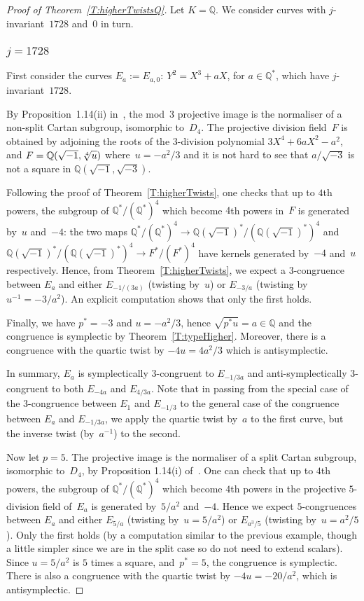 \documentclass[twoside,leqno,symbols-for-thanks, draft]{rmi}
\numberwithin{equation}{section}
\newcommand{\Q}{\mathbb{Q}}
\theoremstyle{remark}
\begin{document}
\begin{proof}[Proof of Theorem~\ref{T:higherTwistsQ}] Let $K=\Q$.  We
  consider curves with $j$-invariant~$1728$ and~$0$ in turn.

\subsubsection*{$j=1728$}
  First consider the curves $E_a := E_{a,0}:\ Y^2=X^3+aX$, for $a \in
  \Q^*$, which have $j$-invariant~$1728$.

  By Proposition~1.14(ii)
  in~\cite{Zywina}, the mod~$3$ projective image is the normaliser of
  a non-split Cartan subgroup, isomorphic to~$D_4$.  The projective
  division field~$F$ is obtained by adjoining the roots of the
  $3$-division polynomial $3X^4+6aX^2-a^2$, and
  $F=\Q(\sqrt{-1},\root4\of u)$ where~$u=-a^2/3$ and it is not hard to
  see that $a/\sqrt{-3}$ is not a square in $\Q(\sqrt{-1},\sqrt{-3})$.

Following the proof of Theorem~\ref{T:higherTwists}, one checks
that up to $4$th powers, the subgroup of $\Q^*/(\Q^*)^4$ which become
$4$th powers in~$F$ is generated by~$u$ and~$-4$: the two maps
$\Q^*/(\Q^*)^4 \to \Q(\sqrt{-1})^*/(\Q(\sqrt{-1})^*)^4$ and
$\Q(\sqrt{-1})^*/(\Q(\sqrt{-1})^*)^4 \to F^*/(F^*)^4$ have kernels
generated by~$-4$ and~$u$ respectively.  Hence, from
Theorem~\ref{T:higherTwists}, we expect a $3$-congruence between
$E_a$ and either $E_{-1/(3a)}$ (twisting by~$u$) or $E_{-3/a}$
(twisting by~$u^{-1}=-3/a^2$).  An explicit computation shows that
only the first holds.

Finally, we have $p^* = -3$ and $u=-a^2/3$, hence $\sqrt{p^*u} = a \in
\Q$ and the congruence is symplectic by Theorem~\ref{T:typeHigher}.
Moreover, there is a congruence with the quartic twist by $-4u=4a^2/3$
which is antisymplectic.

In summary, $E_a$ is symplectically $3$-congruent to $E_{-1/3a}$ and
anti-symplectically $3$-congruent to both $E_{-4a}$ and $E_{4/3a}$.
Note that in passing from the special case of the $3$-congruence
between $E_1$ and $E_{-1/3}$ to the general case of the congruence
between $E_{a}$ and $E_{-1/3a}$, we apply the quartic twist by~$a$ to
the first curve, but the inverse twist (by~$a^{-1}$) to the second.

Now let $p=5$.  The projective image is the normaliser of a split
Cartan subgroup, isomorphic to~$D_4$, by Proposition 1.14(i)
of~\cite{Zywina}.  One can check that up to $4$th powers, the subgroup
of $\Q^*/(\Q^*)^4$ which become $4$th powers in the projective
$5$-division field of~$E_a$ is generated by~$5/a^2$ and~$-4$.  Hence
we expect $5$-congruences between $E_a$ and either $E_{5/a}$ (twisting
by~$u=5/a^2$) or $E_{a^3/5}$ (twisting by~$u=a^2/5$).  Only the first
holds (by a computation similar to the previous example, though a
little simpler since we are in the split case so do not need to extend
scalars).  Since $u=5/a^2$ is $5$ times a square, and~$p^*=5$, the
congruence is symplectic.  There is also a congruence with the quartic
twist by $-4u=-20/a^2$, which is antisymplectic.


\end{proof}
\end{document}
